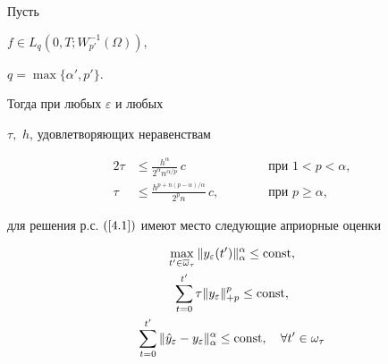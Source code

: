 \begin{lemm}


Пусть


$f\in L_q(0,T;W^{-1}_{p'}(\Omega))$,


$q=\max\{\alpha',p'\}$.


Тогда при любых $\varepsilon $ и любых


$ \tau,$ $h $, удовлетворяющих неравенствам


%


\begin{alignat}{2}


\tau &\le \frac{h^{\alpha}}{2^{\alpha}


 n^{\alpha / p}} \, c &&\qquad\text{ при } 1 < p < \alpha,  \label{5.11}\\


%


\tau &\le \frac{h^{ p+n(p-\alpha)/


\alpha }}{2^{p} n }


{\,} c, &&\qquad\text{ при } p \ge \alpha,\label{5.12}


\end{alignat}


%


для решения р.с. $(\ref{4.1})$ имеют место следующие априорные оценки


\begin{gather}


\max_{t' \in \overline{\omega}_\tau}


\| y_\varepsilon(t') \|^{\alpha }_{\alpha }


\le \const, \label{5.13}\\


%


\sum^{t'}_{t=0}\tau \| y_\varepsilon \|^{p}_{+p}\le


\const,\label{5.14}\\


%


\sum^{t'}_{t=0} \|


\Hat{y}_\varepsilon - y_\varepsilon \|^{\alpha }_{\alpha }


\le \const,\quad\forall t' \in \omega_{\tau}


 \label{5.16}


\end{gather}


\end{lemm}


%


